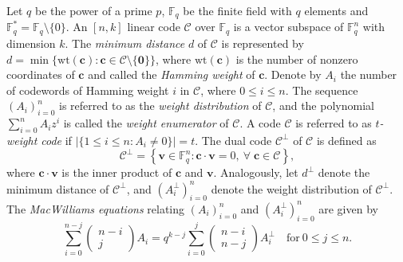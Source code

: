 \documentclass[sn-mathphys-num]{sn-jnl}%
\theoremstyle{thmstyleone}%
\theoremstyle{thmstyletwo}%
\theoremstyle{thmstylethree}%
\begin{document}
Let $q$ be the power of a prime $p$, $\mathbb{F}_q$ be the finite field with $q$ elements and $\mathbb{F}_q^\ast=\mathbb{F}_q\setminus\{0\}$. An $[n,k]$ linear code $\mathcal{C}$ over $\mathbb{F}_q$ is a vector subspace of $\mathbb{F}_q^n$ with dimension $k$. The \textit{minimum distance} $d$ of $\mathcal{C}$ is represented by $d=\min\{\mathrm{wt}(\mathbf{c}):\mathbf{c}\in\mathcal{C}\setminus \{\mathbf{0}\}\}$, where $\mathrm{wt}(\mathbf{c})$ is the number of nonzero coordinates of $\mathbf{c}$ and called the \textit{Hamming weight} of $\mathbf{c}$. Denote by $A_i$ the number of codewords of Hamming weight $i$ in $\mathcal{C}$, where $0\le i \le n$. The sequence $(A_i)_{i=0}^n$ is referred to as the \textit{weight distribution} of $\mathcal{C}$, and the polynomial $\sum_{i=0}^{n}A_iz^i$ is called the \textit{weight enumerator} of $\mathcal{C}$. A code $\mathcal{C}$ is referred to as \textit{$t$-weight code} if $|\{1\le i\le n : A_i \ne 0\}|=t$. The dual code $\mathcal{C}^\perp$ of $\mathcal{C}$ is defined as 
\begin{equation*}
	\mathcal{C}^\perp=\left\{\mathbf{v}\in\mathbb{F}_q^n:\mathbf{c}\cdot\mathbf{v}=0,\ \forall\;\mathbf{c}\in\mathcal{C}\right\},
\end{equation*}
where $\mathbf{c}\cdot\mathbf{v}$ is the inner product of $\mathbf{c}$ and $\mathbf{v}$. Analogously, let $d^\perp$ denote the minimum distance of $\mathcal{C}^\perp$, and $(A_i^\perp)_{i=0}^n$ denote the weight distribution of $\mathcal{C}^\perp$. The \textit{MacWilliams equations} relating $(A_i)_{i=0}^n$ and $(A_i^\perp)_{i=0}^n$ \cite[Lemma 2.9]{MacWilliams1963TheoremDistributionWeight} are given by
\begin{equation}\label{sec1.1 equ1}
	\sum_{i=0}^{n-j}\begin{pmatrix}n-i\\j\end{pmatrix}A_i=q^{k-j}\sum_{i=0}^j\begin{pmatrix}n-i\\n-j\end{pmatrix}A_i^{\perp}\quad\mathrm{for}\ 0\le j \le n.
\end{equation}
\end{document}

